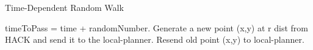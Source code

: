 \begin{algorithm}
    \begin{small}
	\caption{Time-Dependent Random Walk}\label{algo:AugRndWalk}
	\begin{algorithmic}[1]
		    \State timeToPass = time + randomNumber.
			   \State Generate a new point ({x,y}) at r dist from HACK and send it to the local-planner.
		    \Else
			    \State Resend old point ({x,y}) to local-planner.
			\EndIf	
		\EndIf
	\end{algorithmic} 
	\end{small}
\end{algorithm}